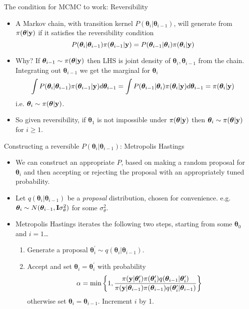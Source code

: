 \documentclass{beamer}
\begin{document}
\begin{frame}{The condition for MCMC to work: Reversibility}
\begin{itemize}
\item A Markov chain, with transition kernel $P({\bm \theta}_i|{\bm \theta}_{i-1})$, will generate from $\pi( {\bm \theta}|{\bf y})$ if it satisfies the reversibility condition
$$
P({\bm \theta}_i|{\bm \theta}_{i-1}) \pi( {\bm \theta}_{i-1}|{\bf y}) = P({\bm \theta}_{i-1}|{\bm \theta}_{i}) \pi( {\bm \theta}_i|{\bf y})
$$
\item Why? If ${\bm \theta}_{i-1} \sim \pi( {\bm \theta}|{\bf y}) $ then LHS is joint density of ${\bm \theta}_i, {\bm \theta}_{i-1}$ from the chain. Integrating out ${\bm \theta}_{i-1}$ we get the marginal for ${\bm \theta}_i$
$$
\int P({\bm \theta}_i|{\bm \theta}_{i-1}) \pi( {\bm \theta}_{i-1}|{\bf y}) d {\bm \theta}_{i-1} = \int P({\bm \theta}_{i-1}|{\bm \theta}_{i}) \pi( {\bm \theta}_i|{\bf y}) d {\bm \theta}_{i-1} = \pi( {\bm \theta}_i|{\bf y})
$$
i.e. ${\bm \theta}_{i} \sim \pi( {\bm \theta}|{\bf y}) $. 
\item So given reversibility, if ${\bm \theta}_1$ is not impossible under $\pi( {\bm \theta}|{\bf y})$ then  ${\bm \theta}_{i} \sim \pi( {\bm \theta}|{\bf y})$ for $i \ge 1$.
\end{itemize}
\end{frame}

\begin{frame}{Constructing a reversible $P({\bm \theta}_i|{\bm \theta}_{i-1})$: Metropolis Hastings}
\begin{itemize}
\item We can construct an appropriate $P$, based on making a random proposal for ${\bm \theta}_i$ and then accepting or rejecting the proposal with an appropriately tuned probability.
\item Let $q({\bm \theta}_i|{\bm \theta}_{i-1})$ be a {\em proposal} distribution, chosen for convenience. e.g. ${\bm \theta}_i \sim N({\bm \theta}_{i-1},{\bf I}\sigma_\theta^2)$ for some $\sigma_\theta^2$.
\item Metropolis Hastings iterates the following two steps, starting from some ${\bm \theta}_0$ and $i=1$\ldots
\begin{enumerate}
\item Generate a proposal ${\bm \theta}_i^\prime \sim q({\bm \theta}_i|{\bm \theta}_{i-1})$.
\item Accept and set ${\bm \theta}_i = {\bm \theta}_i^\prime$ with probability
$$
\alpha = \text{min}\left \{ 1, \frac{\pi({\bf y} | {\bm \theta}_i^\prime)\pi({\bm \theta}_i^\prime)q({\bm \theta}_{i-1}|{\bm \theta}_{i}^\prime)}{
\pi({\bf y} | {\bm \theta}_{i-1})\pi({\bm \theta}_{i-1})q({\bm \theta}_{i}^\prime|{\bm \theta}_{i-1})
}
\right \}
$$
otherwise set ${\bm \theta}_i = {\bm \theta}_{i-1}$. Increment $i$ by 1.
\end{enumerate}
\end{itemize}
\end{frame}
\end{document}
